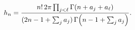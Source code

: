 \[h_{n}=\frac{n!\,2\pi\prod_{j<\ell}\mathop{\Gamma\/}\nolimits\!\left(n+a_{j}+a_%
{\ell}\right)}{(2n-1+\sum_{j}a_{j})\mathop{\Gamma\/}\nolimits\!\left(n-1+\sum_%
{j}a_{j}\right)}.\]